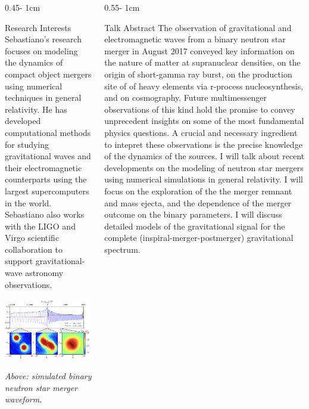 \documentclass{../psuposter}
\begin{document}
\begin{frame}
\begin{columns}[onlytextwidth]
\begin{column}{0.45\textwidth - 1cm}
    \begin{block}{Research Interests}
        Sebastiano's research focuses on modeling the dynamics of compact object mergers using numerical techniques in general relativity. He has developed computational methods for studying gravitational waves and their electromagnetic counterparts using the largest supercomputers in the world. Sebastiano also works with the LIGO and Virgo scientific collaboration to support gravitational-wave astronomy observations. 
        \begin{center}
	    	\includegraphics[width=0.98\textwidth]{images/bernuzzi-merger}    		
    	\end{center}
    	\textit{Above: simulated binary neutron star merger waveform}. \cite{bernuzziModelingCompleteGravitational2015}
    \end{block}
\end{column}


\begin{column}{0.55\textwidth - 1cm}
    \begin{block}{Talk Abstract}
        The observation of gravitational and electromagnetic waves from a binary neutron star merger in August 2017 conveyed key information on the nature of matter at supranuclear densities, on the origin of short-gamma ray burst, on the production site of of heavy elements via r-process nucleosynthesis, and on cosmography. Future multimessenger observations of this kind hold the promise to convey unprecedent insights on some of the most fundamental physics questions. A crucial and necessary ingredient to intepret these observations is the precise knowledge of the dynamics of the sources. I will talk about recent developments on the modeling of neutron star mergers using numerical simulations in general relativity. I will focus on the exploration of the the merger remnant and mass ejecta, and the dependence of the merger outcome on the binary parameters. I will discuss detailed models of the gravitational signal for the complete (inspiral-merger-postmerger) gravitational spectrum.
    \end{block}


\end{column}
\end{columns}
\end{frame}
\end{document}
